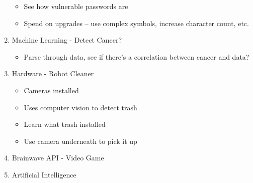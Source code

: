 \documentclass[10pt]{article}
\begin{document}
\begin{enumerate}
\begin{itemize}
        \item See how vulnerable passwords are
        \item Spend on upgrades -- use complex symbols, increase character count, etc.
    \end{itemize}
    \item Machine Learning - Detect Cancer?
    \begin{itemize}
        \item Parse through data, see if there's a correlation between cancer and data?
    \end{itemize}
    \item Hardware - Robot Cleaner
    \begin{itemize}
        \item Cameras installed
        \item Uses computer vision to detect trash
        \item Learn what trash installed
        \item Use camera underneath to pick it up
    \end{itemize}
    \item Brainwave API - Video Game
    \item Artificial Intelligence
\end{enumerate}
\end{document}
